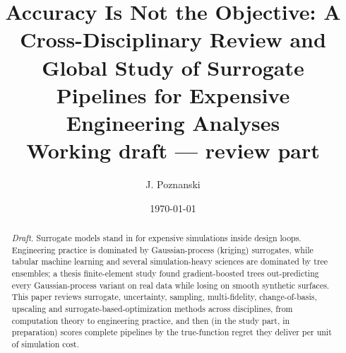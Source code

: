\documentclass[11pt]{article}
\title{Accuracy Is Not the Objective: A Cross-Disciplinary Review and Global Study of Surrogate Pipelines for Expensive Engineering Analyses\\[4pt]\large Working draft --- review part}
\author{J. Poznanski}
\date{\today}
\begin{document}
\maketitle

\begin{abstract}
\textit{Draft.} Surrogate models stand in for expensive simulations inside design loops. Engineering practice is dominated by Gaussian-process (kriging) surrogates, while tabular machine learning and several simulation-heavy sciences are dominated by tree ensembles; a thesis finite-element study found gradient-boosted trees out-predicting every Gaussian-process variant on real data while losing on smooth synthetic surfaces. This paper reviews surrogate, uncertainty, sampling, multi-fidelity, change-of-basis, upscaling and surrogate-based-optimization methods across disciplines, from computation theory to engineering practice, and then (in the study part, in preparation) scores complete pipelines by the true-function regret they deliver per unit of simulation cost.
\end{abstract}















\end{document}

